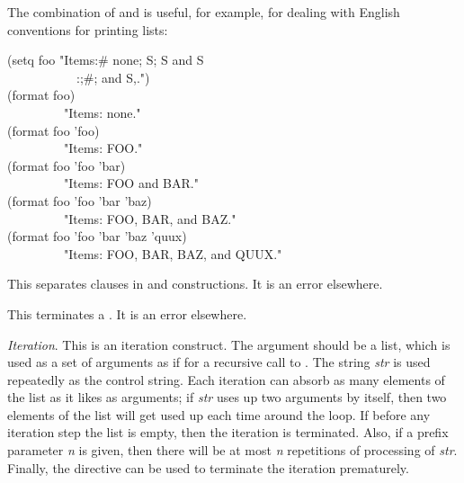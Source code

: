 \begin{flushdesc}
The combination of \cd{{\Xtilde}{\Xlbracket}} and \cd{\#} is useful, for
example, for dealing with English conventions for printing lists:
\begin{lisp}
(setq foo "Items:{\Xtilde}\#{\Xlbracket} none{\Xtilde}; {\Xtilde}S{\Xtilde}; {\Xtilde}S and {\Xtilde}S{\Xtilde} \\
~~~~~~~~~~~{\Xtilde}:;{\Xtilde}{\Xatsign}{\Xlbrace}{\Xtilde}\#{\Xlbracket}{\Xtilde}; and{\Xtilde}{\Xrbracket}
{\Xtilde}S{\Xtilde}{\Xcircumflex},{\Xtilde}{\Xrbrace}{\Xtilde}{\Xrbracket}.") \\
(format {\false} foo) \\ ~~~~~~~~\EV\  "Items: none." \\
(format {\false} foo 'foo) \\
~~~~~~~~\EV\  "Items: FOO." \\
(format {\false} foo 'foo 'bar) \\
~~~~~~~~\EV\  "Items: FOO and BAR." \\
(format {\false} foo 'foo 'bar 'baz) \\
~~~~~~~~\EV\  "Items: FOO, BAR, and BAZ." \\
(format {\false} foo 'foo 'bar 'baz 'quux) \\
~~~~~~~~\EV\  "Items: FOO, BAR, BAZ, and QUUX."
\end{lisp}

\item[\cd{{\Xtilde};}]
This separates clauses in \cd{{\Xtilde}{\Xlbracket}} and \cd{{\Xtilde}<}
constructions.  It is an error elsewhere.

\item[\cd{{\Xtilde}{\Xrbracket}}]
This terminates a \cd{{\Xtilde}{\Xlbracket}}.  It is an error elsewhere.

\item[\cd{{\Xtilde}{\Xlbrace}\emph{str}{\Xtilde}{\Xrbrace}}]
\emph{Iteration}.
This is an iteration construct.  The argument should be a list,
which is used as a set of arguments as if for a recursive call to .
The string \emph{str} is used repeatedly as the control string.
Each iteration can absorb as many elements of the list as it likes
as arguments;
if \emph{str} uses up two arguments by itself, then two elements of the
list will get used up each time around the loop.
If before any iteration step the list is empty, then the iteration is terminated.
Also, if a prefix parameter \emph{n} is given, then there will be at most \emph{n}
repetitions of processing of \emph{str}.  Finally, the
\cd{{\Xtilde}{\Xcircumflex}} directive can be used to terminate the iteration
prematurely.


\end{flushdesc}
